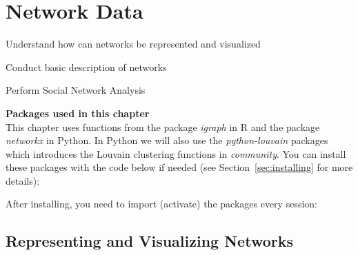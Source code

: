 \chapter{Network Data}
\label{chap:network}

\begin{abstract}{Abstract}

Especially social media data, but also other types of data can often be represented as networks. This chapter introduces \emph{igraph} (R+Python) and \emph{networkx} (Python) to showcase how to deal with such data, perform Social Network Analysis (SNA) and represent it visually.
\end{abstract}


\begin{objectives}
\item Understand how can networks be represented and visualized
\item Conduct basic description of networks
\item Perform Social Network Analysis
\end{objectives}



\newpage
\begin{feature}
  \textbf{Packages used in this chapter}\\
  This chapter uses functions from the package \emph{igraph} in R and the package \emph{networkx} in Python.
  In Python we will also use the \emph{python-louvain} packages which introduces the Louvain clustering functions in \emph{community}.
  You can install these packages with the code below if needed  (see Section~\ref{sec:installing} for more details):


\noindent After installing, you need to import (activate) the packages every session:

\end{feature}


%

\section{Representing and Visualizing Networks}
\label{sec:graph}

